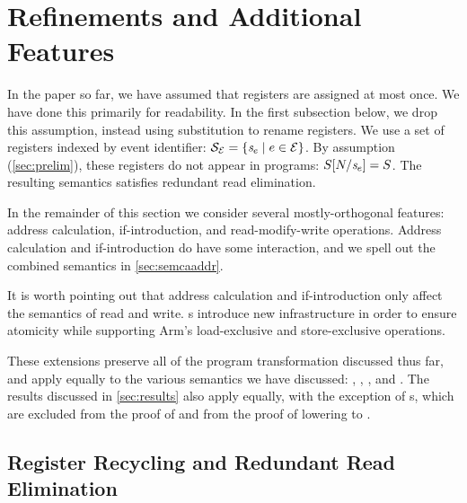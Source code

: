 
\section{Refinements and Additional Features} %
\label{sec:additional}

In the paper so far, we have assumed that registers are assigned at most
once.  We have done this primarily for readability.  In the first subsection
below, we drop this assumption, instead using substitution to rename
registers.  We use a set of registers indexed by event identifier:
$\mathcal{S}_{\mathcal{E}}=\{\mathit{s}_{e}\mid e\in\mathcal{E}\}$.  By assumption
(\textsection\ref{sec:prelim}), these registers do not appear in programs:
$S[N/\mathit{s}_{e}]=S$.  The resulting semantics satisfies
redundant read elimination.


In the remainder of this section we consider several mostly-orthogonal features: address
calculation, if-introduction, and read-modify-write operations.  Address
calculation and if-introduction do have some interaction, and we spell out the
combined semantics in \textsection\ref{sec:semcaaddr}.

It is worth pointing out that address calculation and if-introduction only
affect the semantics of read and write.  \RMW{}s introduce new infrastructure
in order to ensure atomicity while supporting Arm's load-exclusive and
store-exclusive operations.

These extensions preserve all of the program transformation discussed thus
far, and apply equally to the various semantics we have discussed: \PwT{},
, , and \PwTc{}.  The results discussed in
\textsection\ref{sec:results} also apply equally, with the exception of
\RMW{}s, which are excluded from the proof of \drfsc{} and from the proof of
lowering to \armeight{}.


\subsection{Register Recycling and Redundant Read Elimination}
\label{sec:semreg}


